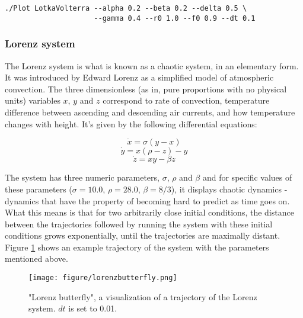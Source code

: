 \begin{verbatim}
./Plot LotkaVolterra --alpha 0.2 --beta 0.2 --delta 0.5 \
                     --gamma 0.4 --r0 1.0 --f0 0.9 --dt 0.1
\end{verbatim}


\subsubsection{Lorenz system}
The Lorenz system\cite{lorenz1963} is what is known as a chaotic system, in an elementary form. It was introduced by Edward Lorenz as a simplified model of atmospheric convection. The three dimensionless (as in, pure proportions with no physical units) variables $x$, $y$ and $z$ correspond to rate of convection, temperature difference between ascending and descending air currents, and how temperature changes with height. It's given by the following differential equations:

\begin{equation}
\dot{x} = \sigma (y - x)
\label{eq:xlor}
\end{equation}
\begin{equation}
\dot{y} = x(\rho - z) - y
\label{eq:ylor}
\end{equation}
\begin{equation}
\dot{z} = xy - \beta z
\label{eq:zlor}
\end{equation}

The system has three numeric parameters, $\sigma$, $\rho$ and $\beta$ and for specific values of these parameters ($\sigma = 10.0$, $\rho = 28.0$, $\beta = 8/3$), it displays chaotic dynamics - dynamics that have the property of becoming hard to predict as time goes on. What this means is that for two arbitrarily close initial conditions, the distance between the trajectories followed by running the system with these initial conditions grows exponentially, until the trajectories are maximally distant. Figure \ref{fig:lorenzbutterfly} shows an example trajectory of the system with the parameters mentioned above.

\begin{figure}
    \centering
    \texttt{[image: figure/lorenzbutterfly.png]}
    \caption{"Lorenz butterfly", a visualization of a trajectory of the Lorenz system. $dt$ is set to 0.01.}
    \label{fig:lorenzbutterfly}
\end{figure}

